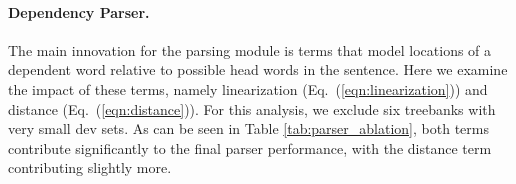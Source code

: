 \documentclass[11pt,a4paper]{article}
\begin{document}
\paragraph{Dependency Parser.}
The main innovation for the parsing module is terms that model locations of a dependent word relative to possible head words in the sentence. Here we examine the impact of these terms, namely linearization (Eq.~(\ref{eqn:linearization})) and distance (Eq.~(\ref{eqn:distance})). For this analysis, we exclude six treebanks with very small dev sets. As can be seen in Table \ref{tab:parser_ablation}, both terms contribute significantly to the final parser performance, with the distance term contributing slightly more.

\begin{figure}
  \centering
  \pipeline


\end{figure}
\end{document}
